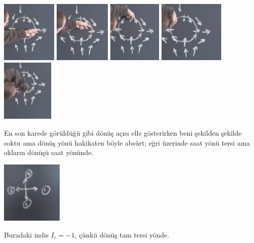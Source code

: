 \documentclass[12pt,fleqn]{article}\usepackage{../../common}
\begin{document}
\includegraphics[height=3cm]{08_18.png}
\includegraphics[height=3cm]{08_19.png}
\includegraphics[height=3cm]{08_20.png}
\includegraphics[height=3cm]{08_21.png}
\includegraphics[height=3cm]{08_22.png}

En son karede görüldüğü gibi dönüş açısı elle gösterirken beni şekilden şekilde
soktu ama dönüş yönü hakikaten böyle absürt; eğri üzerinde saat yönü tersi ama
okların dönüşü saat yönünde. 

\includegraphics[height=3cm]{08_23.png}

Buradaki indis $I_c = -1$, çünkü dönüş tam tersi yönde. 
\end{document}
